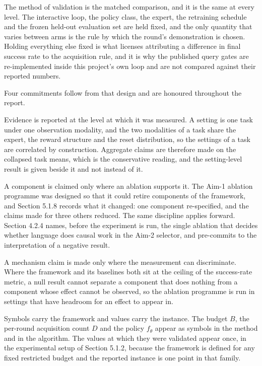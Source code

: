 \documentclass[
  11pt,
]{article}
\begin{document}
The method of validation is the matched comparison, and it is the same
at every level. The interactive loop, the policy class, the expert, the
retraining schedule and the frozen held-out evaluation set are held
fixed, and the only quantity that varies between arms is the rule by
which the round's demonstration is chosen. Holding everything else fixed
is what licenses attributing a difference in final success rate to the
acquisition rule, and it is why the published query gates are
re-implemented inside this project's own loop and are not compared
against their reported numbers.

Four commitments follow from that design and are honoured throughout the
report.

Evidence is reported at the level at which it was measured. A setting is
one task under one observation modality, and the two modalities of a
task share the expert, the reward structure and the reset distribution,
so the settings of a task are correlated by construction. Aggregate
claims are therefore made on the collapsed task means, which is the
conservative reading, and the setting-level result is given beside it
and not instead of it.

A component is claimed only where an ablation supports it. The Aim-1
ablation programme was designed so that it could retire components of
the framework, and Section 5.1.8 records what it changed: one component
re-specified, and the claims made for three others reduced. The same
discipline applies forward. Section 4.2.4 names, before the experiment
is run, the single ablation that decides whether language does causal
work in the Aim-2 selector, and pre-commits to the interpretation of a
negative result.

A mechanism claim is made only where the measurement can discriminate.
Where the framework and its baselines both sit at the ceiling of the
success-rate metric, a null result cannot separate a component that does
nothing from a component whose effect cannot be observed, so the
ablation programme is run in settings that have headroom for an effect
to appear in.

Symbols carry the framework and values carry the instance. The budget
\(B\), the per-round acquisition count \(D\) and the policy \(f_\theta\)
appear as symbols in the method and in the algorithm. The values at
which they were validated appear once, in the experimental setup of
Section 5.1.2, because the framework is defined for any fixed restricted
budget and the reported instance is one point in that family.
\end{document}

